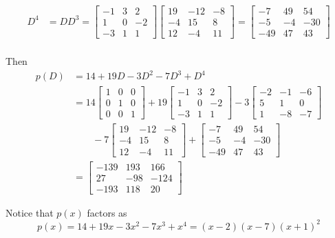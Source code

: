 \documentclass{ximera}
\begin{document}
\begin{example}
\begin{align*}
D^4&=DD^3=
\begin{bmatrix}-1 & 3 & 2\\1 & 0 & -2\\-3 & 1 & 1\end{bmatrix}
\begin{bmatrix}19 & -12 & -8\\-4 & 15 & 8\\12 & -4 & 11\end{bmatrix}
=
\begin{bmatrix}-7 & 49 & 54\\-5 & -4 & -30\\-49 & 47 & 43\end{bmatrix}\\
\end{align*}

Then
\begin{align*}
p(D)&=14+19D-3D^2-7D^3+D^4\\
&=
  14\begin{bmatrix}1 & 0 & 0\\0 & 1 & 0\\0 & 0 & 1\end{bmatrix}
+19\begin{bmatrix}-1 & 3 & 2\\1 & 0 & -2\\-3 & 1 & 1\end{bmatrix}
   -3\begin{bmatrix}-2 & -1 & -6\\5 & 1 & 0\\1 & -8 & -7\end{bmatrix}\\
&\quad\quad
   -7\begin{bmatrix}19 & -12 & -8\\-4 & 15 & 8\\12 & -4 & 11\end{bmatrix}
    +\begin{bmatrix}-7 & 49 & 54\\-5 & -4 & -30\\-49 & 47 & 43\end{bmatrix}\\
&=
\begin{bmatrix}
-139 & 193 & 166\\
27 & -98 & -124\\
-193 & 118 & 20
\end{bmatrix}
\end{align*}

Notice that $p(x)$ factors as
\[
p(x)=14+19x-3x^2-7x^3+x^4=(x-2)(x-7)(x+1)^2
\]


\end{example}
\end{document}
